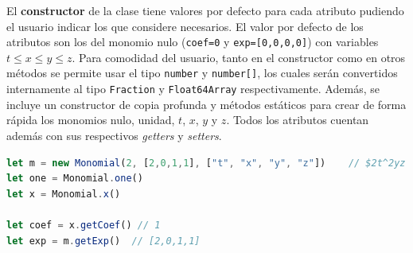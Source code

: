 El \textbf{constructor} de la clase tiene valores por defecto para cada atributo pudiendo el usuario indicar los que considere necesarios. El valor por defecto de los atributos son los del monomio nulo (\texttt{coef=0} y \texttt{exp=[0,0,0,0]}) con variables $t\le x\le y\le z$. Para comodidad del usuario, tanto en el constructor como en otros métodos se permite usar el tipo \texttt{number} y \texttt{number[]}, los cuales serán convertidos internamente al tipo \texttt{Fraction} y \texttt{Float64Array} respectivamente. Además, se incluye un constructor de copia profunda y métodos estáticos para crear de forma rápida los monomios nulo, unidad, $t$, $x$, $y$ y $z$. Todos los atributos cuentan además con sus respectivos \textit{getters} y \textit{setters}.
\begin{lstlisting}[language=Javascript]
let m = new Monomial(2, [2,0,1,1], ["t", "x", "y", "z"])    // $2t^2yz en Q[t,x,y,z]$
let one = Monomial.one()
let x = Monomial.x()

let coef = x.getCoef() // 1
let exp = m.getExp()  // [2,0,1,1]
\end{lstlisting}

